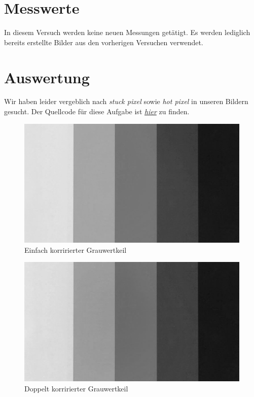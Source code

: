 \documentclass[12pt, oneside, a4paper, \docLanguage]{report}
\begin{document}
\section{Messwerte}
\label{chap:VERSUCH_4_MESSWERTE}
\begin{normalsize}
In diesem Versuch werden keine neuen Messungen getätigt. Es werden lediglich bereits erstellte Bilder aus den vorherigen Versuchen verwendet.
\end{normalsize}

\section{Auswertung}
\label{chap:VERSUCH_4_AUSWERTUNG}
\begin{normalsize}
Wir haben leider vergeblich nach \textit{stuck pixel} sowie \textit{hot pixel} in unseren Bildern gesucht.\newline
Der Quellcode für diese Aufgabe ist \hyperref[chap:APPENDIX_SOURCECODE_V4]{\textit{hier}} zu finden. 
\end{normalsize}
\begin{figure}[H]
\centering
\includegraphics[scale=0.6]{../GreyScaleCorrectedWithBlackWhiteImage.png}
\caption{Einfach korririerter Grauwertkeil}
\end{figure}
\begin{figure}[H]
\centering
\includegraphics[scale=0.6]{../2timesCorrectedGreyScale.png}
\caption{Doppelt korririerter Grauwertkeil}
\end{figure}
\end{document}

